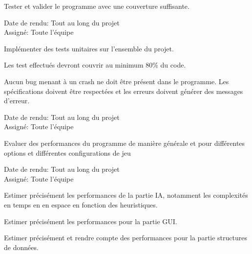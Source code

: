 \documentclass{article}
\begin{document}
\begin{nonfunctionnalneedbox}[F6. Tests]
    Tester et valider le programme avec une couverture suffisante.
    \begin{duedatebox}
        Date de rendu: Tout au long du projet\\
        Assigné: Toute l'équipe
    \end{duedatebox}
    \begin{subneedbox}[F6.1 Tests]
        Implémenter des tests unitaires sur l'ensemble du projet.
    \end{subneedbox}

    \begin{subneedbox}[F6.2 Coverage]
        Les test effectués devront couvrir au minimum 80\% du code.
    \end{subneedbox}
\end{nonfunctionnalneedbox}

\begin{nonfunctionnalneedbox}[F7: Bugs]
    Aucun bug menant à un crash ne doit être présent dans le programme. Les spécifications doivent être respectées et les erreurs doivent générer des messages d'erreur.
    \begin{duedatebox}
        Date de rendu: Tout au long du projet\\
        Assigné: Toute l'équipe
    \end{duedatebox}
\end{nonfunctionnalneedbox}

\begin{nonfunctionnalneedbox}[F8: Performances]
    Evaluer des performances du programme de manière générale et pour différentes options et différentes configurations de jeu
    \begin{duedatebox}
        Date de rendu: Tout au long du projet\\
        Assigné: Toute l'équipe
    \end{duedatebox}
    \begin{subneedbox}[F8.1: IA]
        Estimer précisément les performances de la partie IA, notamment les complexités en temps en en espace en fonction des heuristiques.
    \end{subneedbox}
    \begin{subneedbox}[F8.1: GUI]
        Estimer précisément les performances pour la partie GUI.
    \end{subneedbox}
    \begin{subneedbox}
        Estimer précisément et rendre compte des performances pour la partie structures de données.
    \end{subneedbox}
\end{nonfunctionnalneedbox}
\end{document}

